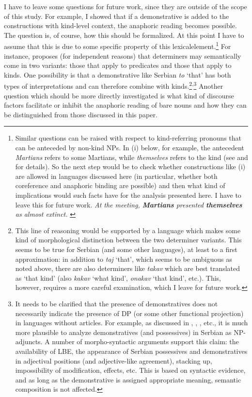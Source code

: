 \documentclass[output=paper,
modfonts
]{langscibook}
\begin{document}
	I have to leave some questions for future work, since they are outside of the scope of this study. For example, I showed that if a demonstrative is added to the constructions with kind-level context, the anaphoric reading becomes possible. The question is, of course, how this should be formalized. At this point I have to assume that this is due to some specific property of this lexical\largerpage[2] element.\footnote{Similar questions can be raised with respect to kind-referring pronouns that can be anteceded by non-kind NPs. In (i) below, for example, the antecedent \textit{Martians} refers to some Martians, while \textit{themselves} refers to the kind (see \citealt{Rooth1985} and \citealt{Krifka2003} for details). So the next step would be to check whether constructions like (i) are allowed in languages discussed here (in particular, whether both coreference and anaphoric binding are possible) and then what kind of implications would such facts have for the analysis presented here. I have to leave this for future work. 
		\ea \textit{At the meeting, \textbf{Martians} presented \textbf{themselves} as almost extinct.}
		\label{ex:despic:n13i}
		\z \label{ft13}
	} For instance, \citet[353]{Chierchia1998} proposes (for independent reasons) that determiners may semantically come in two variants: those that apply to predicates and those that apply to kinds. One possibility is that a demonstrative like Serbian \textit{to} `that' has both types of interpretations and can therefore combine with kinds.\footnote{This line of reasoning would be supported by a language which makes some kind of morphological distinction between the two determiner variants. This seems to be true for Serbian (and some other  languages), at least to a first approximation: in addition to \textit{taj} `that', which seems to be ambiguous as noted above, there are also determiners like \textit{takav} which are best translated as `that kind' (also \textit{kakav} `what kind', \textit{onakav} `that kind', etc.). This, however, requires a more careful examination, which I leave for future work.}\textsuperscript{,}\footnote{It needs to be clarified that the presence of demonstratives does not necessarily indicate the presence of DP (or some other functional projection) in languages without articles. For example, as discussed in \citet{Boskovic2005}, \citet{Despic2011,Despic2013}, \citet{Zlatic1997}, etc., it is much more plausible to analyze demonstratives (and possessives) in Serbian as NP-adjuncts. A number of morpho-syntactic arguments support this claim: the availability of LBE, the appearance of Serbian possessives and demonstratives in adjectival positions (and adjective-like agreement), stacking up, impossibility of modification,  effects, etc. This is based on syntactic evidence, and as long as the demonstrative is assigned appropriate meaning, semantic composition is not affected.} Another question which should be more directly investigated is what kind of discourse factors facilitate or inhibit the anaphoric reading of bare nouns and how they can be distinguished from those discussed in this paper. 
\end{document}
